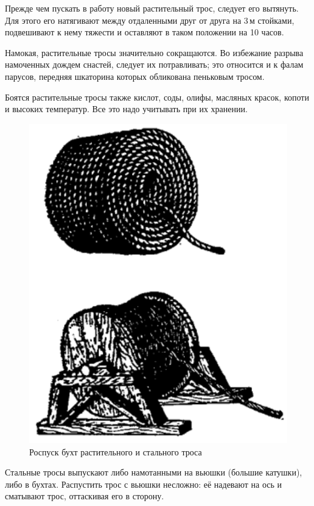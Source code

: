 \documentclass[a4paper, 12pt, twoside, final]{scrbook}
\begin{document}
Прежде чем пускать в работу новый растительный трос, следует его вытянуть. Для этого его натягивают между отдаленными друг от друга на 3\,м стойками, подвешивают к нему тяжести и оставляют в таком положении на 10 часов.

Намокая, растительные тросы значительно сокращаются. Во избежание разрыва намоченных дождем снастей, следует их потравливать; это относится и к фалам парусов, передняя шкаторина которых обликована пеньковым тросом.

Боятся растительные тросы также кислот, соды, олифы, масляных красок, копоти и высоких температур. Все это надо учитывать при их хранении.

\begin{figure}
   \centering
   \includegraphics{pics/57_Rospusk_buht} %
   \caption{Роспуск бухт растительного и стального троса}
   \label{fig:57}
\end{figure}

Стальные тросы выпускают либо намотанными на вьюшки (большие катушки), либо в бухтах. Распустить трос с вьюшки несложно: её надевают на ось и сматывают трос, оттаскивая его в сторону.
\end{document}
